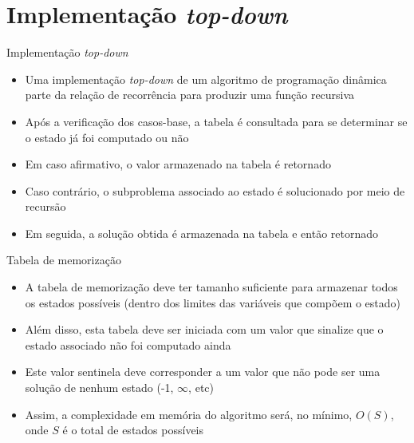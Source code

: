\section{Implementação {\it top-down}}

\begin{frame}[fragile]{Implementação {\it top-down}}

    \begin{itemize}
        \item Uma implementação \textit{top-down} de um algoritmo de programação dinâmica parte
            da relação de recorrência para produzir uma função recursiva

        \item Após a verificação dos casos-base, a tabela é consultada para se determinar se o 
            estado já foi computado ou não

        \item Em caso afirmativo, o valor armazenado na tabela é retornado

        \item Caso contrário, o subproblema associado ao estado é solucionado por meio de recursão

        \item Em seguida, a solução obtida é armazenada na tabela e então retornado
    \end{itemize}

\end{frame}

\begin{frame}[fragile]{Tabela de memorização}

    \begin{itemize}
        \item A tabela de memorização deve ter tamanho suficiente para armazenar todos os estados
            possíveis (dentro dos limites das variáveis que compõem o estado)

        \item Além disso, esta tabela deve ser iniciada com um valor que sinalize que o estado
            associado não foi computado ainda

        \item Este valor sentinela deve corresponder a um valor que não pode ser uma solução de
            nenhum estado (-1, $\infty$, etc)

        \item Assim, a complexidade em memória do algoritmo será, no mínimo, $O(S)$, onde $S$
            é o total de estados possíveis
    \end{itemize}

\end{frame}

